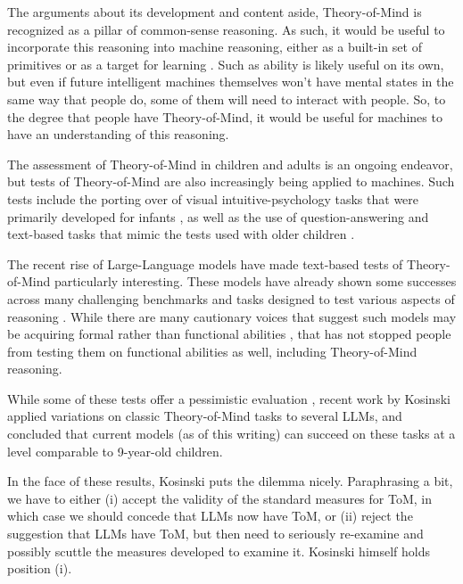 \documentclass{article}
\begin{document}
The arguments about its development and content aside, Theory-of-Mind is recognized as a pillar of common-sense reasoning. As such, it would be useful to incorporate this reasoning into machine reasoning, either as a built-in set of primitives or as a target for learning \citep{lake2017building}. Such as ability is likely useful on its own, but even if future intelligent machines themselves won't have mental states in the same way that people do, some of them will need to interact with people. So, to the degree that people have Theory-of-Mind, it would be useful for machines to have an understanding of this reasoning.

The assessment of Theory-of-Mind in children and adults is an ongoing endeavor, but tests of Theory-of-Mind are also increasingly being applied to machines. Such tests include the porting over of visual intuitive-psychology tasks that were primarily developed for infants \citep{gandhi2021baby,shu2021agent,rabinowitz2018machine}, as well as the use of question-answering and text-based tasks that mimic the tests used with older children \citep[e.g.][]{nematzadeh2018evaluating,sap2019socialiqa,sap2022neural}. 

The recent rise of Large-Language models \citep{vaswani2017attention, devlin2018bert,brown2020language} have made text-based tests of Theory-of-Mind particularly interesting. These models have already shown some successes across many challenging benchmarks and tasks designed to test various aspects of reasoning  \citep{mahowald2023dissociating,lewkowycz2022solving}. While there are many cautionary voices that suggest such models may be acquiring formal rather than functional abilities \citep{mahowald2023dissociating}, that has not stopped people from testing them on functional abilities as well, including Theory-of-Mind reasoning. 

While some of these tests offer a pessimistic evaluation \citep{sap2022neural}, recent work by Kosinski \citep{kosinski2023theory} applied variations on classic Theory-of-Mind tasks to several LLMs, and concluded that current models (as of this writing) can succeed on these tasks at a level comparable to 9-year-old children. 

In the face of these results, Kosinski puts the dilemma nicely. Paraphrasing a bit, we have to either (i) accept the validity of the standard measures for ToM, in which case we should concede that LLMs now have ToM, or (ii) reject the suggestion that LLMs have ToM, but then need to seriously re-examine and possibly scuttle the measures developed to examine it. Kosinski himself holds position (i). 
\end{document}
